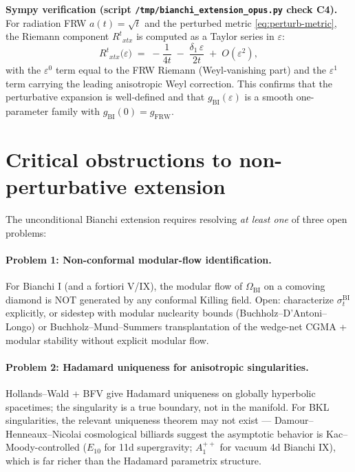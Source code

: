 \documentclass[11pt]{article}
\theoremstyle{definition}
\newcommand{\BI}{\mathrm{BI}}
\newcommand{\FRW}{\mathrm{FRW}}
\begin{document}
\noindent\textbf{Sympy verification (script
\texttt{/tmp/bianchi\_extension\_opus.py} check C4).} For radiation FRW
$a(t)=\sqrt t$ and the perturbed metric \eqref{eq:perturb-metric}, the
Riemann component $R^t{}_{xtx}$ is computed as a Taylor series in
$\varepsilon$:
\begin{equation*}
R^t{}_{xtx}\bigl(\varepsilon\bigr)
   \;=\; -\frac{1}{4t} \;-\; \frac{\delta_1\,\varepsilon}{2t}\;+\;O(\varepsilon^2),
\end{equation*}
with the $\varepsilon^0$ term equal to the FRW Riemann (Weyl-vanishing
part) and the $\varepsilon^1$ term carrying the leading anisotropic
Weyl correction. This confirms that the perturbative expansion is
well-defined and that $g_\BI(\varepsilon)$ is a smooth one-parameter
family with $g_\BI(0)=g_\FRW$.

\section{Critical obstructions to non-perturbative extension}\label{sec:obstructions}

The unconditional Bianchi extension requires resolving \emph{at least
one} of three open problems:

\paragraph{Problem 1: Non-conformal modular-flow identification.}
For Bianchi I (and a fortiori V/IX), the modular flow of $\Omega_\BI$
on a comoving diamond is NOT generated by any conformal Killing field.
Open: characterize $\sigma^{\BI}_t$ explicitly, or sidestep with modular
nuclearity bounds (Buchholz--D'Antoni--Longo) or Buchholz--Mund--Summers
transplantation \cite{BuchholzMundSummers2000} of the wedge-net CGMA
+ modular stability without explicit modular flow.

\paragraph{Problem 2: Hadamard uniqueness for anisotropic singularities.}
Hollands--Wald \cite{HollandsWald2001} + BFV
\cite{BrunettiFredenhagenVerch2003} give Hadamard uniqueness on globally
hyperbolic spacetimes; the singularity is a true boundary, not in the
manifold. For BKL singularities, the relevant uniqueness theorem may
not exist --- Damour--Henneaux--Nicolai cosmological billiards
\cite{DHN2002} suggest the asymptotic behavior is Kac--Moody-controlled
($E_{10}$ for 11d supergravity; $A_1^{++}$ for vacuum 4d Bianchi IX),
which is far richer than the Hadamard parametrix structure.
\end{document}
